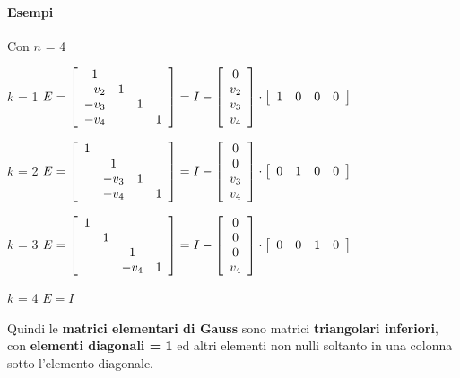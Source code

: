 \documentclass[10pt]{book}
\begin{document}
\paragraph{Esempi} Con $n$ = 4
\begin{list}{}{}
	\item[$k$ = 1]
		\begin{math}
		E = \left[
			\begin{array}{c c c c}
			1 & & & \\
			-v_2 & 1 & & \\
			-v_3 & & 1 & \\
			-v_4 & & & 1
			\end{array}
		\right]
		= I - \left[
		\begin{array}{c}
		0\\v_2\\v_3\\v_4
		\end{array}
		\right]
		\cdot
		\left[
		\begin{array}{c c c c}
		1 & 0 & 0 & 0
		\end{array}
		\right]
		\end{math}
	\item[$k$ = 2]
		\begin{math}
		E = \left[
			\begin{array}{c c c c}
			1 & & & \\
			& 1 & & \\
			& -v_3 & 1 & \\
			& -v_4 & & 1
			\end{array}
		\right]
		= I - \left[
		\begin{array}{c}
		0\\0\\v_3\\v_4
		\end{array}
		\right]
		\cdot
		\left[
		\begin{array}{c c c c}
		0 & 1 & 0 & 0
		\end{array}
		\right]
		\end{math}
	\item[$k$ = 3]
		\begin{math}
		E = \left[
			\begin{array}{c c c c}
			1 & & & \\
			& 1 & & \\
			& & 1 & \\
			& & -v_4 & 1
			\end{array}
		\right]
		= I - \left[
		\begin{array}{c}
		0\\0\\0\\v_4
		\end{array}
		\right]
		\cdot
		\left[
		\begin{array}{c c c c}
		0 & 0 & 1 & 0
		\end{array}
		\right]
		\end{math}
	\item[$k$ = 4] $E = I$
\end{list}
Quindi le \textbf{matrici elementari di Gauss} sono matrici \textbf{triangolari inferiori}, con \textbf{elementi diagonali = 1} ed altri elementi non nulli soltanto in una colonna sotto l'elemento diagonale.
\end{document}
